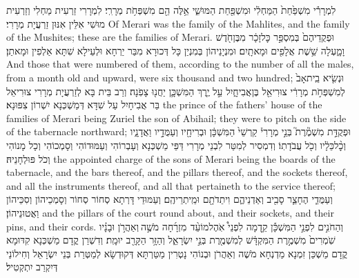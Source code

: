 {לִמְרָרִ֕י מִשְׁפַּ֙חַת֙ הַמַּחְלִ֔י וּמִשְׁפַּ֖חַת הַמּוּשִׁ֑י אֵ֥לֶּה הֵ֖ם מִשְׁפְּחֹ֥ת מְרָרִֽי׃}
{לִמְרָרִי זַרְעִית מַחְלִי וְזַרְעִית מוּשִׁי אִלֵּין אִנּוּן זַרְעֲיָת מְרָרִי׃}
{Of Merari was the family of the Mahlites, and the family of the Mushites; these are the families of Merari.}{}
{וּפְקֻדֵיהֶם֙ בְּמִסְפַּ֣ר כׇּל\maqqaf זָכָ֔ר מִבֶּן\maqqaf חֹ֖דֶשׁ וָמָ֑עְלָה שֵׁ֥שֶׁת אֲלָפִ֖ים וּמָאתָֽיִם׃}
{וּמִנְיָנֵיהוֹן בְּמִנְיַן כָּל דְּכוּרָא מִבַּר יַרְחָא וּלְעֵילָא שִׁתָּא אַלְפִין וּמָאתַן׃}
{And those that were numbered of them, according to the number of all the males, from a month old and upward, were six thousand and two hundred;}{}
{וּנְשִׂ֤יא בֵֽית\maqqaf אָב֙ לְמִשְׁפְּחֹ֣ת מְרָרִ֔י צוּרִיאֵ֖ל בֶּן\maqqaf אֲבִיחָ֑יִל עַ֣ל יֶ֧רֶךְ הַמִּשְׁכָּ֛ן יַחֲנ֖וּ צָפֹֽנָה׃}
{וְרַב בֵּית בָּא לְזַרְעֲיָת מְרָרִי צוּרִיאֵל בַּר אֲבִיחָיִל עַל שִׁדָּא דְּמַשְׁכְּנָא יִשְׁרוֹן צִפּוּנָא׃}
{the prince of the fathers’ house of the families of Merari being Zuriel the son of Abihail; they were to pitch on the side of the tabernacle northward;}{}
{וּפְקֻדַּ֣ת מִשְׁמֶ֘רֶת֮ בְּנֵ֣י מְרָרִי֒ קַרְשֵׁי֙ הַמִּשְׁכָּ֔ן וּבְרִיחָ֖יו וְעַמֻּדָ֣יו וַאֲדָנָ֑יו וְכׇ֨ל\maqqaf כֵּלָ֔יו וְכֹ֖ל עֲבֹדָתֽוֹ׃}
{וְדִמְסִיר לְמִטַּר לִבְנֵי מְרָרִי דַּפֵּי מַשְׁכְּנָא וְעָבְרוֹהִי וְעַמּוּדוֹהִי וְסָמְכוֹהִי וְכָל מָנוֹהִי וְכֹל פּוּלְחָנֵיהּ׃}
{the appointed charge of the sons of Merari being the boards of the tabernacle, and the bars thereof, and the pillars thereof, and the sockets thereof, and all the instruments thereof, and all that pertaineth to the service thereof;}{}
{וְעַמֻּדֵ֧י הֶחָצֵ֛ר סָבִ֖יב וְאַדְנֵיהֶ֑ם וִיתֵדֹתָ֖ם וּמֵֽיתְרֵיהֶֽם׃}
{וְעַמּוּדֵי דָּרְתָא סְחוֹר סְחוֹר וְסָמְכֵיהוֹן וְסִכֵּיהוֹן וַאֲטוּנֵיהוֹן׃}
{and the pillars of the court round about, and their sockets, and their pins, and their cords.}{}
{וְהַחֹנִ֣ים לִפְנֵ֣י הַמִּשְׁכָּ֡ן קֵ֣דְמָה לִפְנֵי֩ אֹֽהֶל\maqqaf מוֹעֵ֨ד \pasek  מִזְרָ֜חָה מֹשֶׁ֣ה \legarmeh  וְאַהֲרֹ֣ן וּבָנָ֗יו שֹֽׁמְרִים֙ מִשְׁמֶ֣רֶת הַמִּקְדָּ֔שׁ לְמִשְׁמֶ֖רֶת בְּנֵ֣י יִשְׂרָאֵ֑ל וְהַזָּ֥ר הַקָּרֵ֖ב יוּמָֽת׃}
{וְדִשְׁרַן קֳדָם מַשְׁכְּנָא קִדּוּמָא קֳדָם מַשְׁכַּן זִמְנָא מַדְנְחָא מֹשֶׁה וְאַהֲרֹן וּבְנוֹהִי נָטְרִין מַטַּרְתָּא דְּקוּדְשָׂא לְמַטְּרַת בְּנֵי יִשְׂרָאֵל וְחִילוֹנַי דְּיִקְרַב יִתְקְטִיל׃}
